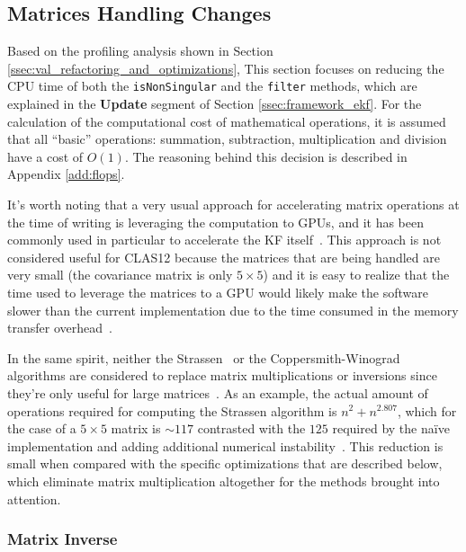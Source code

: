 \subsection{Matrices Handling Changes} \label{ssec:prop_matrices}
Based on the profiling analysis shown in Section \ref{ssec:val_refactoring_and_optimizations}, This section focuses on reducing the CPU time of both the \texttt{isNonSingular} and the \texttt{filter} methods, which are explained in the \textbf{Update} segment of Section \ref{ssec:framework_ekf}.
For the calculation of the computational cost of mathematical operations, it is assumed that all ``basic'' operations: summation, subtraction, multiplication and division have a cost of $O(1)$.
The reasoning behind this decision is described in Appendix \ref{add:flops}.

It's worth noting that a very usual approach for accelerating matrix operations at the time of writing is leveraging the computation to GPUs, and it has been commonly used in particular to accelerate the KF itself~\cite{huang2011accelerating,blattner2011performance}.
This approach is not considered useful for CLAS12 because the matrices that are being handled are very small (the covariance matrix is only $5\times5$) and it is easy to realize that the time used to leverage the matrices to a GPU would likely make the software slower than the current implementation due to the time consumed in the memory transfer overhead~\cite{moravanszky2003dense}.

In the same spirit, neither the Strassen~\cite{strassen1969gaussian} or the Coppersmith-Winograd~\cite{coppersmith1990matrix} algorithms are considered to replace matrix multiplications or inversions since they're only useful for large matrices~\cite{ballard2012communication}.
As an example, the actual amount of operations required for computing the Strassen algorithm is $n^2 + n^{2.807}$, which for the case of a $5\times5$ matrix is $\sim117$ contrasted with the $125$ required by the na\"ive implementation and adding additional numerical instability~\cite{ballard2012communication}.
This reduction is small when compared with the specific optimizations that are described below, which eliminate matrix multiplication altogether for the methods brought into attention.

\subsubsection{Matrix Inverse} \label{sssec:prop_matrix_inverse}

